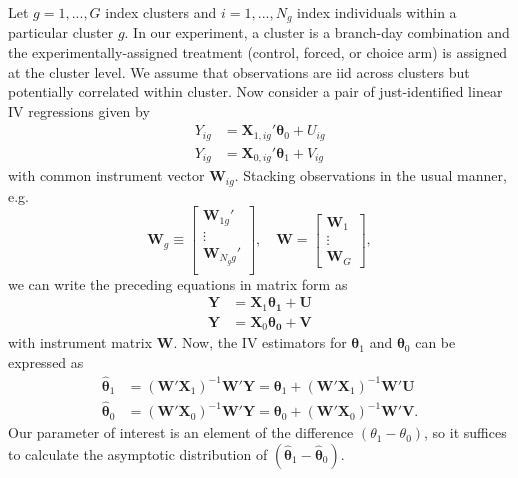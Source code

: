 Let $g = 1, ..., G$ index clusters and $i = 1, ..., N_g$ index individuals within a particular cluster $g$. 
In our experiment, a cluster is a branch-day combination and the experimentally-assigned treatment (control, forced, or choice arm) is assigned at the cluster level.
We assume that observations are iid across clusters but potentially correlated within cluster.
Now consider a pair of just-identified linear IV regressions given by
\begin{align*}
Y_{ig} &= \boldsymbol{X}_{1,ig}' \boldsymbol{\theta}_0 + U_{ig} \\
Y_{ig} &= \boldsymbol{X}_{0,ig}' \boldsymbol{\theta}_1 + V_{ig}
\end{align*}
with common instrument vector $\boldsymbol{W}_{ig}$. 
Stacking observations in the usual manner, e.g.\
\[
\mathbf{W}_g \equiv \begin{bmatrix}
\boldsymbol{W}_{1g}' \\
\vdots \\
\boldsymbol{W}_{N_gg}' \\
\end{bmatrix}, \quad
\mathbf{W} = \begin{bmatrix}
\mathbf{W}_1\\ \vdots \\ \mathbf{W}_G
\end{bmatrix},
\]
we can write the preceding equations in matrix form as
\begin{align*}
\mathbf{Y} &= \mathbf{X}_1\boldsymbol{\theta_1} + \mathbf{U}\\
\mathbf{Y} &= \mathbf{X}_0\boldsymbol{\theta_0} + \mathbf{V}
\end{align*}
with instrument matrix $\mathbf{W}$.
Now, the IV estimators for $\boldsymbol{\theta}_1$ and $\boldsymbol{\theta}_0$ can be expressed as 
\begin{align*}
\widehat{\boldsymbol{\theta}}_1 
&= \left(\mathbf{W}'\mathbf{X}_1\right)^{-1}\mathbf{W}'\mathbf{Y}  = \boldsymbol{\theta}_1 + \left(\mathbf{W}'\mathbf{X}_1\right)^{-1}\mathbf{W}'\mathbf{U}\\ 
\widehat{\boldsymbol{\theta}}_0 
&= \left(\mathbf{W}'\mathbf{X}_0\right)^{-1}\mathbf{W}'\mathbf{Y} = \boldsymbol{\theta}_0 + \left(\mathbf{W}'\mathbf{X}_0\right)^{-1}\mathbf{W}'\mathbf{V}.
\end{align*}
Our parameter of interest is an element of the difference $(\theta_1 - \theta_0)$, so  it suffices to calculate the asymptotic distribution of $(\widehat{\boldsymbol{\theta}}_1 - \widehat{\boldsymbol{\theta}}_0)$.

